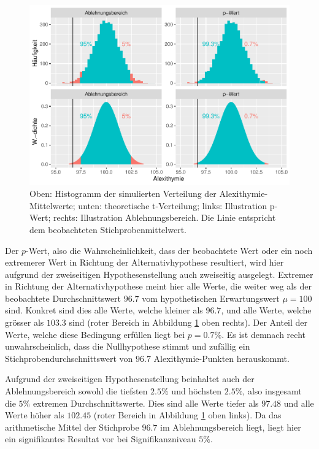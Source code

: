 \documentclass[
]{book}
\theoremstyle{definition}
\theoremstyle{definition}
\theoremstyle{definition}
\theoremstyle{definition}
\theoremstyle{remark}
\begin{document}
\begin{figure}

{\centering \includegraphics{aps_statistik1_files/figure-latex/exm-alexithymie-plot-1} 

}

\caption{Oben: Histogramm der simulierten Verteilung der Alexithymie-Mittelwerte; unten: theoretische t-Verteilung; links: Illustration p-Wert; rechts: Illustration Ablehnungsbereich. Die Linie entspricht dem beobachteten Stichprobenmittelwert.}\label{fig:exm-alexithymie-plot}
\end{figure}

Der \(p\)-Wert, also die Wahrscheinlichkeit, dass der beobachtete Wert oder ein noch extremerer Wert in Richtung der Alternativhypothese resultiert, wird hier aufgrund der zweiseitigen Hypothesenstellung auch zweiseitig ausgelegt. Extremer in Richtung der Alternativhypothese meint hier alle Werte, die weiter weg als der beobachtete Durchschnittswert \(96.7\) vom hypothetischen Erwartungswert \(\mu = 100\) sind. Konkret sind dies alle Werte, welche kleiner als \(96.7\), und alle Werte, welche grösser als \(103.3\) sind (roter Bereich in Abbildung \ref{fig:exm-alexithymie-plot} oben rechts). Der Anteil der Werte, welche diese Bedingung erfüllen liegt bei \(p = 0.7\%\). Es ist demnach recht unwahrscheinlich, dass die Nullhypothese stimmt und zufällig ein Stichprobendurchschnittswert von \(96.7\) Alexithymie-Punkten herauskommt.

Aufgrund der zweiseitigen Hypothesenstellung beinhaltet auch der Ablehnungsbereich sowohl die tiefsten \(2.5\%\) und höchsten \(2.5\%\), also insgesamt die \(5\%\) extremen Durchschnittswerte. Dies sind alle Werte tiefer als \(97.48\) und alle Werte höher als \(102.45\) (roter Bereich in Abbildung \ref{fig:exm-alexithymie-plot} oben links). Da das arithmetische Mittel der Stichprobe \(96.7\) im Ablehnungsbereich liegt, liegt hier ein signifikantes Resultat vor bei Signifikanzniveau \(5\%\).
\end{document}
